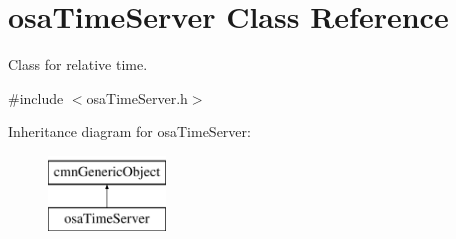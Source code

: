 \hypertarget{classosa_time_server}{}\section{osa\+Time\+Server Class Reference}
\label{classosa_time_server}


Class for relative time.  




{\ttfamily \#include $<$osa\+Time\+Server.\+h$>$}

Inheritance diagram for osa\+Time\+Server\+:\begin{figure}[H]
\begin{center}
\leavevmode
\includegraphics[height=2.000000cm]{d4/de7/classosa_time_server}
\end{center}
\end{figure}
